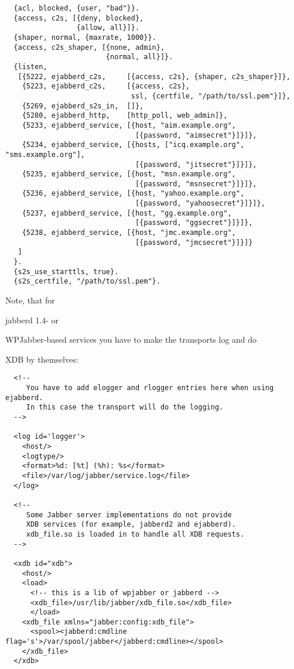 \documentclass[a4paper,10pt]{article}
\newcommand{\ind}[1]{\begin{latexonly}\index{#1}\end{latexonly}}
\begin{document}
\begin{verbatim}
  {acl, blocked, {user, "bad"}}.
  {access, c2s, [{deny, blocked},
                 {allow, all}]}.
  {shaper, normal, {maxrate, 1000}}.
  {access, c2s_shaper, [{none, admin},
                        {normal, all}]}.
  {listen,
   [{5222, ejabberd_c2s,     [{access, c2s}, {shaper, c2s_shaper}]},
    {5223, ejabberd_c2s,     [{access, c2s},
                              ssl, {certfile, "/path/to/ssl.pem"}]},
    {5269, ejabberd_s2s_in,  []},
    {5280, ejabberd_http,    [http_poll, web_admin]},
    {5233, ejabberd_service, [{host, "aim.example.org",
                               [{password, "aimsecret"}]}]},
    {5234, ejabberd_service, [{hosts, ["icq.example.org", "sms.example.org"],
                               [{password, "jitsecret"}]}]},
    {5235, ejabberd_service, [{host, "msn.example.org",
                               [{password, "msnsecret"}]}]},
    {5236, ejabberd_service, [{host, "yahoo.example.org",
                               [{password, "yahoosecret"}]}]},
    {5237, ejabberd_service, [{host, "gg.example.org",
                               [{password, "ggsecret"}]}]},
    {5238, ejabberd_service, [{host, "jmc.example.org",
                               [{password, "jmcsecret"}]}]}
   ]
  }.
  {s2s_use_starttls, true}.
  {s2s_certfile, "/path/to/ssl.pem"}.
\end{verbatim}
Note, that for \ind{jabberd 1.4}jabberd 1.4- or \ind{WPJabber}WPJabber-based
services you have to make the transports log and do \ind{XDB}XDB by themselves:
\begin{verbatim}
  <!--
     You have to add elogger and rlogger entries here when using ejabberd.
     In this case the transport will do the logging.
  -->

  <log id='logger'>
    <host/>
    <logtype/>
    <format>%d: [%t] (%h): %s</format>
    <file>/var/log/jabber/service.log</file>
  </log>

  <!--
     Some Jabber server implementations do not provide
     XDB services (for example, jabberd2 and ejabberd).
     xdb_file.so is loaded in to handle all XDB requests.
  -->

  <xdb id="xdb">
    <host/>
    <load>
      <!-- this is a lib of wpjabber or jabberd -->
      <xdb_file>/usr/lib/jabber/xdb_file.so</xdb_file>
      </load>
    <xdb_file xmlns="jabber:config:xdb_file">
      <spool><jabberd:cmdline flag='s'>/var/spool/jabber</jabberd:cmdline></spool>
    </xdb_file>
  </xdb>
\end{verbatim}
\end{document}
